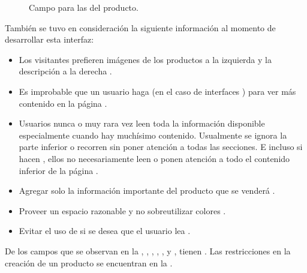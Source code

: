 \begin{description}
\begin{figure}[H]
					\caption{Campo para las \tagsForm del producto.}
					\label{figure:productos:details:write:component_tags}
				\end{figure}
				
		\end{description}

		También se tuvo en consideración la siguiente información al momento de desarrollar esta interfaz:

		\begin{itemize}
			\item Los visitantes prefieren imágenes de los productos a la izquierda y la descripción a la derecha \cite{online_cxpartners_official_people_see_to_buy}.
			\item Es improbable que un usuario haga \scrollCPT(en el caso de interfaces \desktop) para ver más contenido en la página \cite{online_cxpartners_official_people_see_to_buy}.
			\item Usuarios nunca o muy rara vez leen toda la información disponible especialmente cuando hay muchísimo contenido. Usualmente se ignora la parte inferior o recorren sin poner atención a todas las secciones. E incluso si hacen \scrollCPT, ellos no necesariamente leen o ponen atención a todo el contenido inferior de la página \cite{online_cxpartners_official_people_see_to_buy}.
			\item Agregar solo la información importante del producto que se venderá \cite{online_cxpartners_official_people_see_to_buy}.

			\item Proveer un espacio razonable y no sobreutilizar colores \cite{online_cxpartners_official_people_see_to_buy}.

			\item Evitar el uso de \clicking si se desea que el usuario lea \cite{online_cxpartners_official_people_see_to_buy}.
		\end{itemize}


		De los campos que se observan en la , \titleForm, \pageTitleForm, \vendorForm, \descriptionForm, \tagsForm y \detailsForm, tienen \feedbackReactivoDEF. Las restricciones en la creación de un producto se encuentran en la . 

